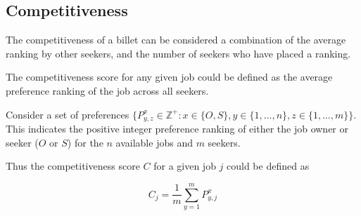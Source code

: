 \subsection{Competitiveness}

The competitiveness of a billet can be considered a combination of the average ranking by other seekers, and the number of seekers who have placed a ranking. 

The competitiveness score for any given job could be defined as the average preference ranking of the job across all seekers.

Consider a set of preferences $\{P^{x}_{y,z} \in \mathbb{Z}^+: x \in \{O,S\}, y \in \{1, \dots, n\}, z \in \{1, \dots, m\}\}$. This indicates the positive integer preference ranking of either the job owner or seeker ($O$ or $S$) for the $n$ available jobs and $m$ seekers. 

Thus the competitiveness score $C$ for a given job $j$ could be defined as 

\[C_j = \frac{1}{m}\sum_{y=1}^m P^{x}_{y,j}\]
